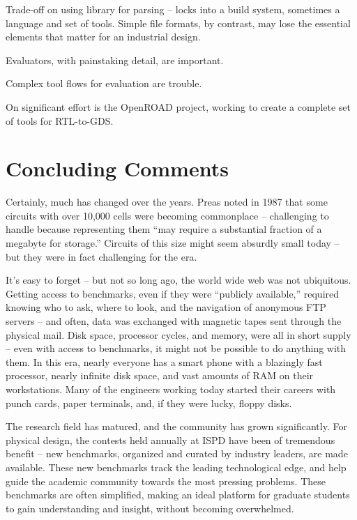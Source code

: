 \documentclass[sigconf]{acmart}
\begin{document}
Trade-off on using library for parsing -- locks into a build
system, sometimes a language and set of tools.  Simple
file formats, by contrast, may lose the essential elements
that matter for an industrial design.

Evaluators, with painstaking detail, are important.

Complex tool flows for evaluation are trouble.

\fi



On significant effort is the OpenROAD\cite{Ajayi19} project,
working to create a complete set of tools for RTL-to-GDS.




\section{Concluding Comments}


Certainly, much has changed over the years.  Preas\cite{Preas87}
noted in 1987 that some circuits with over 10,000 cells were becoming
commonplace -- challenging to handle because representing them
``may require a substantial fraction of a megabyte for storage.''
Circuits of this size might seem absurdly small today -- but they
were in fact challenging for the era.

It's easy to forget -- but not so long ago, the world wide web was not
ubiquitous. Getting access to benchmarks, even if they were ``publicly
available,'' required knowing who to ask, where to look, and the
navigation of anonymous FTP servers -- and often, data was
exchanged with magnetic tapes sent through the physical mail.
Disk space, processor cycles,
and memory, were all in short supply -- even with access to
benchmarks, it might not be possible to do anything with them.  In
this era, nearly everyone has a smart phone with a blazingly fast
processor, nearly infinite disk space, and vast amounts of RAM on
their workstations.  Many of the engineers working today started their
careers with punch cards, paper terminals, and, if they were lucky,
floppy disks.

The research field has matured, and the community has grown
significantly.  For physical design, the contests held annually
at ISPD have been of tremendous benefit -- new benchmarks, organized
and curated by industry leaders, are made available.  These
new benchmarks track the leading technological edge, and help
guide the academic community towards the most pressing problems.
These benchmarks are often simplified, making an ideal platform
for graduate students to gain understanding and insight, without
becoming overwhelmed.
\end{document}
